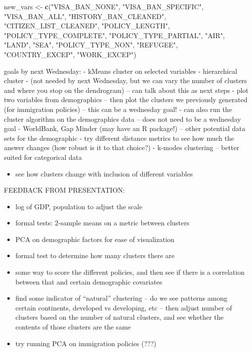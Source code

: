 \documentclass[]{article}
\newenvironment{Shaded}{\begin{snugshade}}{\end{snugshade}}
\newcommand{\KeywordTok}[1]{\textcolor[rgb]{0.13,0.29,0.53}{\textbf{#1}}}
\newcommand{\NormalTok}[1]{#1}
\newcommand{\StringTok}[1]{\textcolor[rgb]{0.31,0.60,0.02}{#1}}
\providecommand{\tightlist}{%
  \setlength{\itemsep}{0pt}\setlength{\parskip}{0pt}}
\begin{document}
\begin{Shaded}
\begin{Highlighting}[]
\NormalTok{new_vars <-}\StringTok{ }\KeywordTok{c}\NormalTok{(}\StringTok{"VISA_BAN_NONE"}\NormalTok{, }\StringTok{"VISA_BAN_SPECIFIC"}\NormalTok{, }\StringTok{"VISA_BAN_ALL"}\NormalTok{,}
          \StringTok{"HISTORY_BAN_CLEANED"}\NormalTok{, }\StringTok{"CITIZEN_LIST_CLEANED"}\NormalTok{, }\StringTok{"POLICY_LENGTH"}\NormalTok{,}
          \StringTok{"POLICY_TYPE_COMPLETE"}\NormalTok{, }\StringTok{"POLICY_TYPE_PARTIAL"}\NormalTok{, }\StringTok{"AIR"}\NormalTok{, }\StringTok{"LAND"}\NormalTok{, }\StringTok{"SEA"}\NormalTok{, }
          \StringTok{"POLICY_TYPE_NON"}\NormalTok{, }\StringTok{"REFUGEE"}\NormalTok{, }\StringTok{"COUNTRY_EXCEP"}\NormalTok{, }\StringTok{"WORK_EXCEP"}\NormalTok{)}
\end{Highlighting}
\end{Shaded}

goals by next Wednesday: - kMeans cluster on selected variables -
hierarchical cluster - (not needed by next Wednesday, but we can vary
the number of clusters and where you stop on the dendrogram) -- can talk
about this as next steps - plot two variables from demographics -- then
plot the clusters we previously generated (for immigration policies) --
this can be a wednesday goal! - can also run the cluster algorithm on
the demographics data -- does not need to be a wednesday goal -
WorldBank, Gap Minder (may have an R package!) -- other potential data
sets for the demographic - try different distance metrics to see how
much the answer changes (how robust is it to that choice?) - k-modes
clustering -- better suited for categorical data

\begin{itemize}
\tightlist
\item
  see how clusters change with inclusion of different variables
\end{itemize}

FEEDBACK FROM PRESENTATION:

\begin{itemize}
\tightlist
\item
  log of GDP, population to adjust the scale
\item
  formal tests: 2-sample means on a metric between clusters
\item
  PCA on demographic factors for ease of visualization
\item
  formal test to determine how many clusters there are
\item
  some way to score the different policies, and then see if there is a
  correlation between that and certain demographic covariates
\item
  find some indicator of ``natural'' clustering -- do we see patterns
  among certain continents, developed vs developing, etc -- then adjust
  number of clusters based on the number of natural clusters, and see
  whether the contents of those clusters are the same
\item
  try running PCA on immigration policies (???)
\end{itemize}
\end{document}
